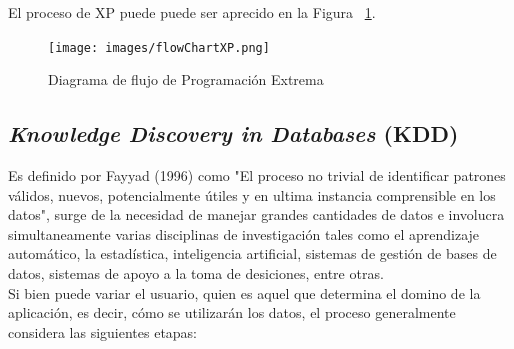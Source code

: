 El proceso de XP puede puede ser aprecido en la Figura ~\ref{fig:procesoXP}.

\begin{figure}[!ht]
	\centering
	\captionsetup{justification=centering}
	\texttt{[image: images/flowChartXP.png]}
	\caption[Diagrama de flujo de Programación Extrema.]{Diagrama de flujo de Programación Extrema}
	\label{fig:procesoXP}
\end{figure}

\subsection{\textit{Knowledge Discovery in Databases} (KDD)}
\label{subsec:kdd}

Es definido por Fayyad (1996) como "El proceso no trivial de identificar patrones válidos, nuevos, potencialmente útiles y en ultima instancia comprensible en los datos", surge de la necesidad de manejar grandes cantidades de datos e involucra simultaneamente varias disciplinas de investigación tales como el aprendizaje automático, la estadística, inteligencia artificial, sistemas de gestión de bases de datos, sistemas de apoyo a la toma de desiciones, entre otras.\\

Si bien puede variar el usuario, quien es aquel que determina el domino de la aplicación, es decir, cómo se utilizarán los datos, el proceso generalmente considera las siguientes etapas:

